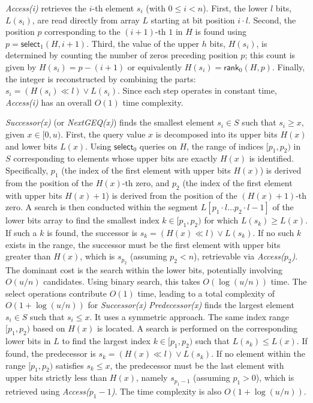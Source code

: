 \emph{Access(i)} retrieves the $i$-th element $s_i$ (with $0 \le i < n$). First, the lower $l$ bits, $L(s_i)$, are read directly from array $L$ starting at bit position $i \cdot l$. Second, the position $p$ corresponding to the $(i+1)$-th $1$ in $H$ is found using $p = \textsf{select}_1(H, i+1)$. Third, the value of the upper $h$ bits, $H(s_i)$, is determined by counting the number of zeros preceding position $p$; this count is given by $H(s_i) = p - (i+1)$ or equivalently $H(s_i) = \textsf{rank}_0(H, p)$. Finally, the integer is reconstructed by combining the parts: $s_i = (H(s_i) \ll l) \lor L(s_i)$. Since each step operates in constant time, \emph{Access(i)} has an overall $O(1)$ time complexity.

\emph{Successor(x)} (or \emph{NextGEQ(x)}) finds the smallest element $s_i \in S$ such that $s_i \ge x$, given $x \in [0, u)$. First, the query value $x$ is decomposed into its upper bits $H(x)$ and lower bits $L(x)$. Using $\textsf{select}_0$ queries on $H$, the range of indices $[p_1, p_2)$ in $S$ corresponding to elements whose upper bits are exactly $H(x)$ is identified. Specifically, $p_1$ (the index of the first element with upper bits $H(x)$) is derived from the position of the $H(x)$-th zero, and $p_2$ (the index of the first element with upper bits $H(x)+1$) is derived from the position of the $(H(x)+1)$-th zero. A search is then conducted within the segment $L[p_1 \cdot l \dots p_2 \cdot l - 1]$ of the lower bits array to find the smallest index $k \in [p_1, p_2)$ for which $L(s_k) \ge L(x)$. If such a $k$ is found, the successor is $s_k = (H(x) \ll l) \lor L(s_k)$. If no such $k$ exists in the range, the successor must be the first element with upper bits greater than $H(x)$, which is $s_{p_2}$ (assuming $p_2 < n$), retrievable via \emph{Access($p_2$)}. The dominant cost is the search within the lower bits, potentially involving $O(u/n)$ candidates. Using binary search, this takes $O(\log(u/n))$ time. The select operations contribute $O(1)$ time, leading to a total complexity of $O(1 + \log(u/n))$ for \emph{Successor(x)}
\emph{Predecessor(x)} finds the largest element $s_i \in S$ such that $s_i \le x$. It uses a symmetric approach. The same index range $[p_1, p_2)$ based on $H(x)$ is located. A search is performed on the corresponding lower bits in $L$ to find the largest index $k \in [p_1, p_2)$ such that $L(s_k) \le L(x)$. If found, the predecessor is $s_k = (H(x) \ll l) \lor L(s_k)$. If no element within the range $[p_1, p_2)$ satisfies $s_k \le x$, the predecessor must be the last element with upper bits strictly less than $H(x)$, namely $s_{p_1-1}$ (assuming $p_1 > 0$), which is retrieved using \emph{Access($p_1-1$)}. The time complexity is also $O(1 + \log(u/n))$.

